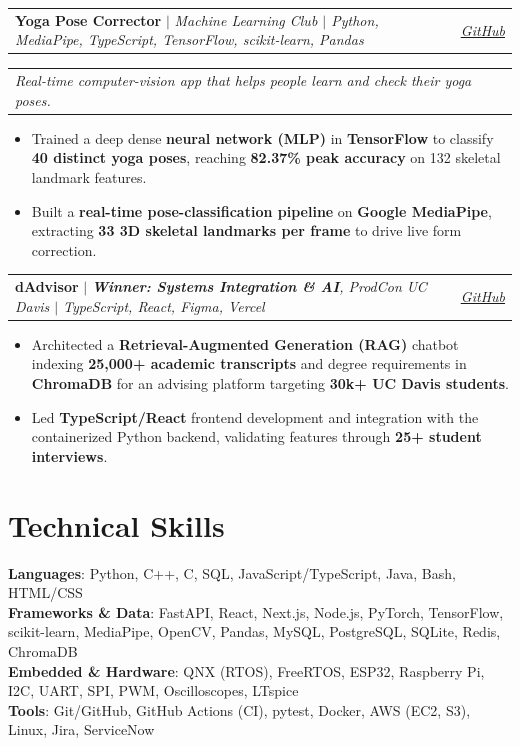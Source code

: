 \documentclass[letterpaper,10pt]{article}
\makeatletter
\newcommand{\resumeItem}[1]{\item\small\baselineskip=10.6pt #1 \vspace{-1pt}}
\newcommand{\resumeProjectHeading}[2]{
    \vspace{3pt}\item
    \begin{tabular*}{0.97\textwidth}{l@{\extracolsep{\fill}}r}
      \normalsize #1 & \normalsize #2 \\
    \end{tabular*}\vspace{-4pt}
}
\newcommand{\resumeProjectDesc}[1]{\vspace{6pt}\newline\begin{tabular*}{0.97\textwidth}{l}\small\textit{#1}\end{tabular*}\vspace{-3pt}}
\newcommand{\resumeSubHeadingListStart}{\begin{itemize}[leftmargin=0.15in, label={}]}
\newcommand{\resumeSubHeadingListEnd}{\end{itemize}}
\newcommand{\resumeItemListStart}{\begin{itemize}[label=\textbullet, itemsep=2.6pt, parsep=0pt, topsep=2.5pt]}
\newcommand{\resumeItemListEnd}{\end{itemize}\vspace{-2pt}}
\makeatother
\begin{document}
    \resumeProjectHeading
      {\textbf{Yoga Pose Corrector} $|$ \small\emph{Machine Learning Club $|$ Python, MediaPipe, TypeScript, TensorFlow, scikit-learn, Pandas}}{\href{https://github.com/Cheemasukh962/yoga_pose_corrector}{\underline{\textit{GitHub}}}}
      \resumeProjectDesc{Real-time computer-vision app that helps people learn and check their yoga poses.}
      \resumeItemListStart
        \resumeItem{Trained a deep dense \textbf{neural network (MLP)} in \textbf{TensorFlow} to classify \textbf{40 distinct yoga poses}, reaching \textbf{82.37\% peak accuracy} on 132 skeletal landmark features.}
        \resumeItem{Built a \textbf{real-time pose-classification pipeline} on \textbf{Google MediaPipe}, extracting \textbf{33 3D skeletal landmarks per frame} to drive live form correction.}
      \resumeItemListEnd

    \resumeProjectHeading
      {\textbf{dAdvisor} $|$ \small\emph{\textbf{Winner: Systems Integration \& AI}, ProdCon UC Davis $|$ TypeScript, React, Figma, Vercel}}{\href{https://github.com/Pocket-sys32/dAdvisor}{\underline{\textit{GitHub}}}}
      \resumeItemListStart
             \resumeItem{Architected a \textbf{Retrieval-Augmented Generation (RAG)} chatbot indexing \textbf{25,000+ academic transcripts} and degree requirements in \textbf{ChromaDB} for an advising platform targeting \textbf{30k+ UC Davis students}.}
        \resumeItem{Led \textbf{TypeScript/React} frontend development and integration with the containerized Python backend, validating features through \textbf{25+ student interviews}.}

  \resumeSubHeadingListEnd

\section{Technical Skills}
  \resumeSubHeadingListStart
    \vspace{3pt}\small{\item{\baselineskip=12pt
      \textbf{Languages}{: Python, C++, C, SQL, JavaScript/TypeScript, Java, Bash, HTML/CSS} \\
      \textbf{Frameworks \& Data}{: FastAPI, React, Next.js, Node.js, PyTorch, TensorFlow, scikit-learn, MediaPipe, OpenCV, Pandas, MySQL, PostgreSQL, SQLite, Redis, ChromaDB} \\
      \textbf{Embedded \& Hardware}{: QNX (RTOS), FreeRTOS, ESP32, Raspberry Pi, I2C, UART, SPI, PWM, Oscilloscopes, LTspice} \\
      \textbf{Tools}{: Git/GitHub, GitHub Actions (CI), pytest, Docker, AWS (EC2, S3), Linux, Jira, ServiceNow}
    }}
  \resumeSubHeadingListEnd
\end{document}
